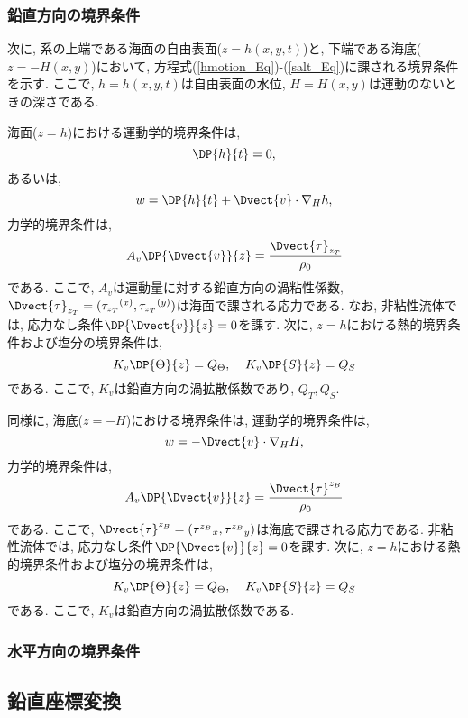 \documentclass[a4j,12pt,openbib,oneside]{jreport}
\begin{document}
\subsubsection*{鉛直方向の境界条件}
次に, 系の上端である海面の自由表面($z=h(x,y,t)$)と, 下端である海底($z=-H(x,y)$)において,  
方程式(\ref{hmotion_Eq})-(\ref{salt_Eq})に課される境界条件を示す. 
ここで, $h=h(x,y,t)$は自由表面の水位, $H=H(x,y)$は運動のないときの深さである. 

海面($z=h$)における運動学的境界条件は, 
\begin{equation}
  \DP{h}{t} = 0, 
\end{equation}
あるいは, 
\begin{equation}
 w = \DP{h}{t} + \Dvect{v} \cdot \nabla_H h, 
\end{equation}
力学的境界条件は, 
\begin{equation}
 A_v \DP{\Dvect{v}}{z} = \dfrac{\Dvect{\tau}_{z_T}}{\rho_0} 
\end{equation}
である. 
ここで, $A_v$は運動量に対する鉛直方向の渦粘性係数, 
$\Dvect{\tau}_{z_T} = ({\tau_{z_T}}^{(x)}, {\tau_{z_T}}^{(y)})$は海面で課される応力である. 
なお, 非粘性流体では, 応力なし条件$\DP{\Dvect{v}}{z}=0$を課す.   
次に, $z=h$における熱的境界条件および塩分の境界条件は, 
\begin{equation}
 K_v \DP{\Theta}{z} = Q_\Theta, \;\;\;\;
 K_v \DP{S}{z} = Q_S
\end{equation}
である. ここで, $K_v$は鉛直方向の渦拡散係数であり, 
$Q_T, Q_S$. 



同様に, 海底($z=-H$)における境界条件は, 
運動学的境界条件は, 
\begin{equation}
 w = - \Dvect{v} \cdot \nabla_H H, 
\end{equation}
力学的境界条件は, 
\begin{equation}
 A_v \DP{\Dvect{v}}{z} = \dfrac{\Dvect{\tau}^{z_B}}{\rho_0} 
\end{equation}
である. 
ここで, 
$\Dvect{\tau}^{z_B} = ({\tau^{z_B}}_{x}, {\tau^{z_B}}_{y})$は海底で課される応力である. 
非粘性流体では, 応力なし条件$\DP{\Dvect{v}}{z}=0$を課す.   
次に, $z=h$における熱的境界条件および塩分の境界条件は, 
\begin{equation}
 K_v \DP{\Theta}{z} = Q_\Theta, \;\;\;\;
 K_v \DP{S}{z} = Q_S
\end{equation}
である. ここで, $K_v$は鉛直方向の渦拡散係数である.

\subsubsection*{水平方向の境界条件}

\subsection{鉛直座標変換}

%
\end{document}
